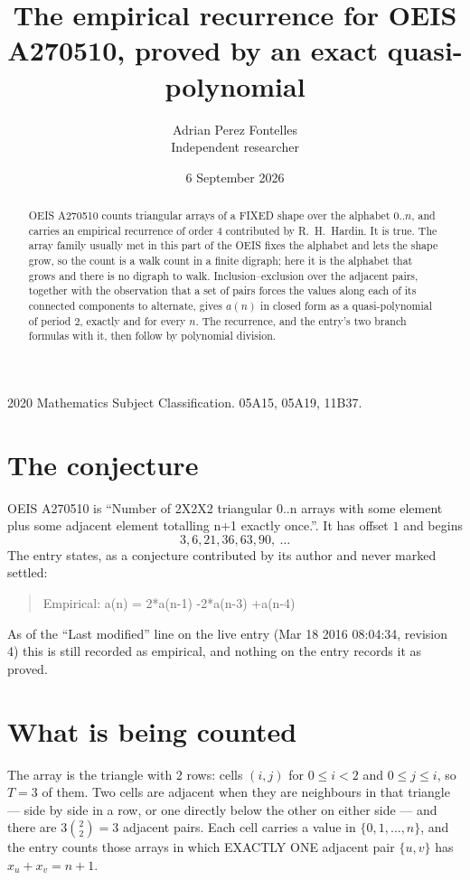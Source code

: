 \documentclass[11pt,a4paper]{article}
\title{The empirical recurrence for OEIS A270510, proved by an exact quasi-polynomial}
\author{Adrian Perez Fontelles\\ \small Independent researcher}
\date{6 September 2026}
\theoremstyle{plain}
\theoremstyle{definition}
\begin{document}
\maketitle

\begin{abstract}
OEIS A270510 counts triangular arrays of a FIXED shape over the alphabet $0..n$, and carries an
empirical recurrence of order $4$ contributed by R.~H.~Hardin. It is true. The array
family usually met in this part of the OEIS fixes the alphabet and lets the shape grow, so the
count is a walk count in a finite digraph; here it is the alphabet that grows and there is no
digraph to walk. Inclusion--exclusion over the adjacent pairs, together with the observation
that a set of pairs forces the values along each of its connected components to alternate,
gives $a(n)$ in closed form as a quasi-polynomial of period $2$, exactly and for every $n$.
The recurrence, and the entry's two branch formulas with it, then follow by polynomial
division.
\end{abstract}

\noindent\small 2020 Mathematics Subject Classification. 05A15, 05A19, 11B37.\normalsize

\section{The conjecture}

OEIS A270510 is ``Number of 2X2X2 triangular 0..n arrays with some element plus some adjacent element totalling n+1 exactly once.''. It has offset $1$ and begins
\[
3, 6, 21, 36, 63, 90,\ \dots
\]
The entry states, as a conjecture contributed by its author and never marked settled:
\begin{quote}
Empirical: a(n) = 2*a(n-1) -2*a(n-3) +a(n-4)
\end{quote}
As of the ``Last modified'' line on the live entry (Mar 18 2016 08:04:34, revision 4) this is still
recorded as empirical, and nothing on the entry records it as proved.

\section{What is being counted}

The array is the triangle with $2$ rows: cells $(i,j)$ for $0\le i<2$ and $0\le j\le i$,
so $T=3$ of them. Two cells are adjacent when they are neighbours in that triangle --- side
by side in a row, or one directly below the other on either side --- and there are
$3\binom{2}{2}=3$ adjacent pairs. Each cell carries a value in
$\{0,1,\dots,n\}$, and the entry counts those arrays in which EXACTLY ONE adjacent pair
$\{u,v\}$ has $x_u+x_v=n+1$.
\end{document}

